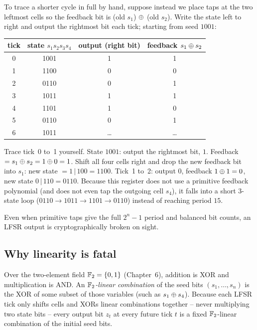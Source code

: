 To trace a shorter cycle in full by hand, suppose instead we place taps at the two leftmost cells so the feedback bit is (old $s_1$) $\oplus$ (old $s_2$). Write the state left to right and output the rightmost bit each tick; starting from seed $1001$:

\begin{center}
\begin{tabular}{cccc}
\toprule
tick & state $s_1s_2s_3s_4$ & output (right bit) & feedback $s_1\oplus s_2$ \\
\midrule
0 & 1001 & 1 & 1 \\
1 & 1100 & 0 & 0 \\
2 & 0110 & 0 & 1 \\
3 & 1011 & 1 & 1 \\
4 & 1101 & 1 & 0 \\
5 & 0110 & 0 & 1 \\
6 & 1011 & \dots & \dots \\
\bottomrule
\end{tabular}
\end{center}

\begin{walkbox}
Trace tick~0 to~1 yourself. State $1001$: output the rightmost bit, $1$. Feedback $= s_1 \oplus s_2 = 1 \oplus 0 = 1$. Shift all four cells right and drop the new feedback bit into $s_1$: new state $= 1\,|\,100 = 1100$. Tick~1 to~2: output $0$, feedback $1\oplus 1 = 0$, new state $0\,|\,110 = 0110$. Because this register does not use a primitive feedback polynomial (and does not even tap the outgoing cell $s_4$), it falls into a short 3-state loop ($0110 \to 1011 \to 1101 \to 0110$) instead of reaching period $15$.
\end{walkbox}

Even when primitive taps give the full $2^n - 1$ period and balanced bit counts, an LFSR output is cryptographically broken on sight.

\subsection{Why linearity is fatal}
\label{ch10:lfsr-weak}

Over the two-element field $\mathbb{F}_2 = \{0,1\}$ (Chapter~6), addition is XOR and multiplication is AND. An \emph{$\mathbb{F}_2$-linear combination} of the seed bits $(s_1, \dots, s_n)$ is the XOR of some subset of those variables (such as $s_1 \oplus s_4$). Because each LFSR tick only shifts cells and XORs linear combinations together -- never multiplying two state bits -- every output bit $z_t$ at every future tick $t$ is a fixed $\mathbb{F}_2$-linear combination of the initial seed bits.

